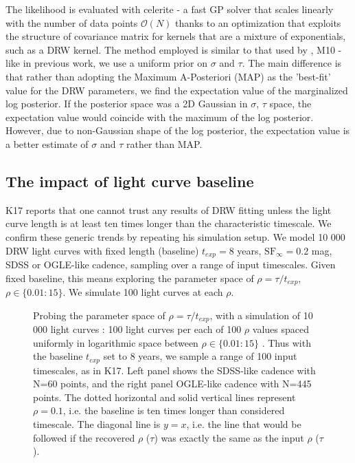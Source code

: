 \documentclass[twocolumn]{aastex62}
\newcommand{\project}[1]{\textsf{#1}}
\begin{document}
The likelihood is evaluated with   \project{celerite}\citep{foreman2017} - a fast GP solver that scales linearly with the number of data points $\mathcal{O}(N)$ thanks to an optimization that exploits the structure of covariance matrix for kernels that are a mixture of exponentials, such as a DRW kernel\citep{foreman2018,ambikasaran2015}. The method employed is similar to that used by \cite{rybicki1992, kozlowski2010},  M10 - like in previous work, we use a  uniform prior on $\sigma$ and $\tau$.  The main difference is that rather than adopting the Maximum A-Posteriori (MAP) as the 'best-fit' value for the DRW parameters,  we find the expectation value of the marginalized log posterior. If the posterior space was a 2D Gaussian in $\sigma$, $\tau$ space, the expectation value would coincide with the maximum of the log posterior. However, due to non-Gaussian shape of the log posterior, the expectation value is a better   estimate of $\sigma$ and $\tau$  rather than MAP. 

\subsection{The impact of light curve baseline}\label{sec:baseline}

K17 reports that one cannot trust any results of DRW fitting unless the light curve length is at least ten times longer than the characteristic timescale. We confirm these generic trends by repeating his simulation setup. We  model 10 000  DRW light curves with fixed length (baseline) $t_{exp}=8$ years, $\mathrm{SF}_{\infty} = 0.2$ mag, SDSS or OGLE-like cadence, sampling over a range of input timescales. Given fixed baseline, this means exploring the parameter space of $\rho = \tau / t_{exp}$, $\rho \in   \{ 0.01 : 15\}$. We simulate 100 light curves at each $\rho$. 

\begin{figure*}
\caption{Probing the parameter space of $\rho = \tau / t_{exp}$, with a simulation of  10 000 light curves : 100 light curves per each of 100 $\rho$ values spaced uniformly in logarithmic space between $\rho \in   \{ 0.01 : 15\}$ . Thus with the baseline $t_{exp}$ set to 8 years,  we sample a range of 100 input timescales, as in K17. Left panel shows the SDSS-like cadence with N=60 points, and the right panel OGLE-like cadence with N=445 points. The dotted horizontal and solid vertical lines represent $\rho = 0.1$, i.e. the baseline is ten times longer than considered timescale. The diagonal line is $y=x$, i.e. the line that would be followed if the recovered  $\rho$ ($\tau$) was exactly the same as the input $\rho$ ($\tau$).} 
\label{fig:rho_space}
\end{figure*}
\end{document}
